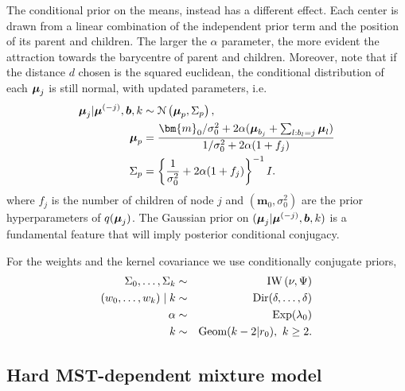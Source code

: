 The conditional prior on the means, instead has a different effect.
Each center is drawn from a linear combination of the independent
prior term and the position of its parent and children.  The larger
the $\alpha$ parameter, the more evident the attraction towards the
barycentre of parent and children.  Moreover, note that if the
distance $d$ chosen is the squared euclidean, the conditional
distribution of each $\mbox{\boldmath $\mu$}_j$ is still normal, with updated
parameters, i.e.
\begin{align}
\bfmu_j | \bfmu^{(-j)}, \bfb, k &\sim \mathcal{N}\left( \bfmu_p, \Sigma_p\right),\nonumber \\ 
\bfmu_p &= \frac{\bm{m}_0/\sigma_0^2 + 2 \alpha (\bfmu_{b_j} + \sum_{l:b_l = j} \bfmu_l)}{1/\sigma_0^2 + 2 \alpha (1 + f_j)} \label{eq:mu_cond_eucl1} \\
\Sigma_p &= \left\{ \frac{1}{\sigma_0^2} + 2 \alpha (1 + f_j) \right\}^{-1} I.
\label{eq:mu_cond_eucl2}
\end{align}
where $f_j$ is the number of children of node $j$ and $(\bm{m}_0, \sigma_0^2)$ are the prior hyperparameters of $q(\mbox{\boldmath $\mu$}_j)$. The Gaussian prior on $(\mbox{\boldmath $\mu$}_j | \mbox{\boldmath $\mu$}^{(-j)}, \mbox{\boldmath $b$}, k)$ is a fundamental feature that will imply posterior conditional conjugacy. 

For the weights and the kernel covariance we use conditionally conjugate priors, 
\begin{eqnarray}
	\Sigma_0, \dots, \Sigma_k & \sim & \mbox{IW}\left( \nu, \Psi \right) \nonumber \\
	(w_0, \dots, w_k) \mid k &  \sim & \mbox{Dir}(\delta, \dots, \delta) 	\label{eq:prior_cov}\\
	\alpha &\sim & \mbox{Exp}(\lambda_0) \nonumber\\
	k &\sim & \text{Geom}(k - 2 | r_0), \ k \geq 2. \nonumber
\end{eqnarray}


\subsection{Hard MST-dependent mixture model}
\label{sec:model2_mst}


